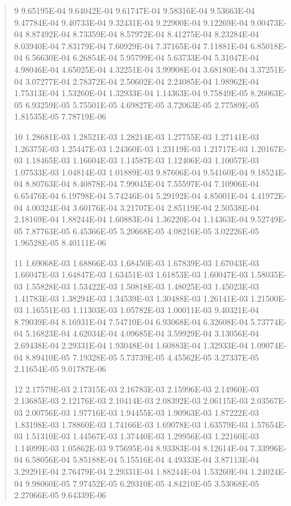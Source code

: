 \documentclass[letterpaper,10pt,english]{sphinxmanual}
\begin{document}
\begin{quote}
\begin{DUlineblock}{0em}
\begin{DUlineblock}{\DUlineblockindent}
\item[] 9   9.65195E-04  9.64042E-04  9.61747E-04  9.58316E-04  9.53663E-04  9.47784E-04  9.40733E-04  9.32431E-04  9.22900E-04  9.12269E-04  9.00473E-04  8.87492E-04  8.73359E-04  8.57972E-04  8.41275E-04  8.23284E-04  8.03940E-04  7.83179E-04  7.60929E-04  7.37165E-04  7.11881E-04  6.85018E-04  6.56630E-04  6.26854E-04  5.95799E-04  5.63733E-04  5.31047E-04  4.98046E-04  4.65025E-04  4.32251E-04  3.99908E-04  3.68180E-04  3.37251E-04  3.07277E-04  2.78372E-04  2.50602E-04  2.24085E-04  1.98962E-04  1.75313E-04  1.53260E-04  1.32933E-04  1.14363E-04  9.75849E-05  8.26063E-05  6.93259E-05  5.75501E-05  4.69827E-05  3.72063E-05  2.77589E-05  1.81535E-05  7.78719E-06
\end{DUlineblock}
\item[] 10   1.28681E-03  1.28521E-03  1.28214E-03  1.27755E-03  1.27141E-03  1.26375E-03  1.25447E-03  1.24360E-03  1.23119E-03  1.21717E-03  1.20167E-03  1.18465E-03  1.16604E-03  1.14587E-03  1.12406E-03  1.10057E-03  1.07533E-03  1.04814E-03  1.01889E-03  9.87606E-04  9.54160E-04  9.18524E-04  8.80763E-04  8.40878E-04  7.99045E-04  7.55597E-04  7.10906E-04  6.65476E-04  6.19798E-04  5.74246E-04  5.29192E-04  4.85001E-04  4.41972E-04  4.00324E-04  3.60176E-04  3.21707E-04  2.85119E-04  2.50538E-04  2.18169E-04  1.88244E-04  1.60883E-04  1.36220E-04  1.14363E-04  9.52749E-05  7.87763E-05  6.45366E-05  5.20668E-05  4.08216E-05  3.02226E-05  1.96528E-05  8.40111E-06
\item[] 11   1.69068E-03  1.68866E-03  1.68450E-03  1.67839E-03  1.67043E-03  1.66047E-03  1.64847E-03  1.63451E-03  1.61853E-03  1.60047E-03  1.58035E-03  1.55828E-03  1.53422E-03  1.50818E-03  1.48025E-03  1.45023E-03  1.41783E-03  1.38294E-03  1.34539E-03  1.30488E-03  1.26141E-03  1.21500E-03  1.16551E-03  1.11303E-03  1.05782E-03  1.00011E-03  9.40321E-04  8.79039E-04  8.16931E-04  7.54710E-04  6.93068E-04  6.32608E-04  5.73774E-04  5.16823E-04  4.62034E-04  4.09685E-04  3.59929E-04  3.13056E-04  2.69438E-04  2.29331E-04  1.93048E-04  1.60883E-04  1.32933E-04  1.09074E-04  8.89410E-05  7.19328E-05  5.73739E-05  4.45562E-05  3.27337E-05  2.11654E-05  9.01787E-06
\item[] 12   2.17579E-03  2.17315E-03  2.16783E-03  2.15996E-03  2.14960E-03  2.13685E-03  2.12176E-03  2.10414E-03  2.08392E-03  2.06115E-03  2.03567E-03  2.00756E-03  1.97716E-03  1.94455E-03  1.90963E-03  1.87222E-03  1.83198E-03  1.78860E-03  1.74166E-03  1.69078E-03  1.63579E-03  1.57654E-03  1.51310E-03  1.44567E-03  1.37440E-03  1.29956E-03  1.22160E-03  1.14099E-03  1.05862E-03  9.75695E-04  8.93383E-04  8.12614E-04  7.33996E-04  6.58056E-04  5.85188E-04  5.15516E-04  4.49333E-04  3.87113E-04  3.29291E-04  2.76479E-04  2.29331E-04  1.88244E-04  1.53260E-04  1.24024E-04  9.98060E-05  7.97452E-05  6.29310E-05  4.84210E-05  3.53068E-05  2.27066E-05  9.64339E-06

\end{DUlineblock}
\end{quote}
\end{document}
